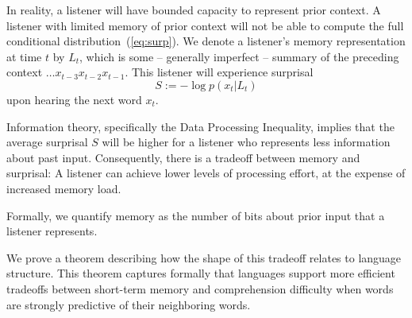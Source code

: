 \documentclass[11pt,letterpaper]{article}
\newcounter{theorem}
\begin{document}
In reality, a listener will have bounded capacity to represent prior context.
A listener with limited memory of prior context will not be able to compute the full conditional distribution~(\ref{eq:surp}).
We denote a listener's memory representation at time $t$ by $L_t$, which is some -- generally imperfect -- summary of the preceding context $\dots x_{t-3}x_{t-2}x_{t-1}$.
This listener will experience surprisal
\begin{equation}\label{eq:surp-listener}
	S :=	-\log p(x_t|L_t)
\end{equation}
upon hearing the next word $x_t$.

Information theory, specifically the Data Processing Inequality, implies that the average surprisal $S$ will be higher for a listener who represents less information about past input.
Consequently, there is a tradeoff between memory and surprisal:
A listener can achieve lower levels of processing effort, at the expense of increased memory load.

Formally, we quantify memory as the number of bits about prior input that a listener represents.


We prove a theorem describing how the shape of this tradeoff relates to language structure. %
This theorem captures formally that languages support more efficient tradeoffs between short-term memory and comprehension difficulty when words are strongly predictive of their neighboring words.
\end{document}
